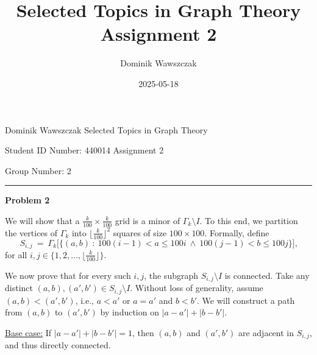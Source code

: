 \documentclass[12pt]{article}
\title{Selected Topics in Graph Theory Assignment 2}
\author{Dominik Wawszczak}
\date{2025-05-18}
\begin{document}
	\setlength{\parindent}{0 cm}
	
	Dominik Wawszczak \hfill Selected Topics in Graph Theory
	
	Student ID Number: 440014 \hfill Assignment 2
	
	Group Number: 2
	
	\bigskip
	\hrule
	\bigskip
	
	\textbf{Problem 2}
	
	\medskip
	
	We will show that a \(\frac{k}{100} \times \frac{k}{100}\) grid is a minor
	of \(\Gamma_{k} \setminus I\). To this end, we partition the vertices of
	\(\Gamma_{k}\) into \(\big\lfloor \frac{k}{100} \big\rfloor^{2}\) squares of
	size \(100 \times 100\). Formally, define
	\[
		S_{i, j} \ = \ \Gamma_{k} \big[ \{(a, b) \ : \ 100 (i - 1) < a \leqslant
		100 i \ \wedge \ 100 (j - 1) < b \leqslant 100 j\} \big] \text{,}
	\]
	for all \(i, j \in \big\{ 1, 2, \ldots, \big\lfloor \frac{k}{100}
	\big\rfloor \big\}\).
	
	\medskip
	
	We now prove that for every such \(i, j\), the subgraph \(S_{i, j} \setminus
	I\) is connected. Take any distinct \((a, b), (a', b') \in S_{i, j}
	\setminus I\). Without loss of generality, assume \((a, b) < (a', b')\),
	i.e., \(a < a'\) or \(a = a'\) and \(b < b'\). We will construct a path from
	\((a, b)\) to \((a', b')\) by induction on \(|a - a'| + |b - b'|\).
	
	\medskip
	
	\underline{Base case:} If \(|a - a'| + |b - b'| = 1\), then \((a, b)\) and
	\((a', b')\) are adjacent in \(S_{i, j}\), and thus directly connected.
	
	\medskip
	
\end{document}
